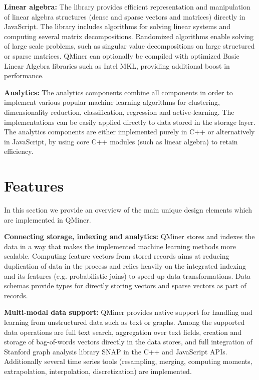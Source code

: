 \documentclass{article} %
\begin{document}
\textbf{Linear algebra:} The library provides efficient representation and manipulation of linear algebra structures (dense and sparse vectors and matrices) directly in JavaScript. The library includes algorithms for solving linear systems and computing several matrix decompositions. Randomized algorithms enable solving of large scale problems, such as singular value decompositions\cite{tropp} on large structured or sparse matrices. QMiner can optionally be compiled with optimized Basic Linear Algebra libraries such as Intel MKL, providing additional boost in performance.

\textbf{Analytics:} The analytics components combine all components in order to implement various popular machine learning algorithms for clustering, dimensionality reduction, classification, regression and active-learning. The implementations can be easily applied directly to data stored in the storage layer. The analytics components are either implemented purely in C++ or alternatively in JavaScript, by using core C++ modules (such as linear algebra) to retain efficiency.


\section{Features}

In this section we provide an overview of the main unique design elements which are implemented in QMiner.

\textbf{Connecting storage, indexing and analytics:} QMiner stores and indexes the data in a way that makes the implemented machine learning methods more scalable. Computing feature vectors from stored records aims at reducing duplication of data in the process and relies heavily on the integrated indexing and its features (e.g. probabilistic joins) to speed up data transformations. Data schemas provide types for directly storing vectors and sparse vectors as part of records.

\textbf{Multi-modal data support:} QMiner provides native support for handling and learning from unstructured data such as text or graphs. Among the supported data operations are full text search, aggregation over text fields, creation and storage of bag-of-words vectors directly in the data stores, and full integration of Stanford graph analysis library SNAP \cite{snap} in the C++ and JavaScript APIs. Additionally several time series tools (resampling, merging, computing moments, extrapolation, interpolation, discretization) are implemented.
\end{document}
